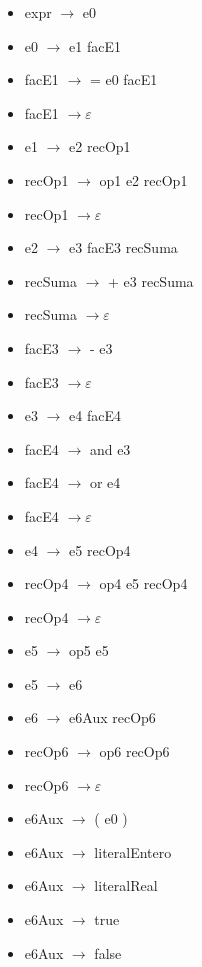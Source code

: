 \documentclass[11pt]{article}
\begin{document}
        \begin{itemize}
            \item expr $\rightarrow$ e0
            \item e0 $\rightarrow$ e1 facE1
            \item facE1 $\rightarrow$ = e0 facE1
            \item facE1 $\rightarrow \varepsilon$
            \item e1 $\rightarrow$ e2 recOp1
            \item recOp1 $\rightarrow$ op1 e2 recOp1
            \item recOp1 $\rightarrow \varepsilon$
            \item e2 $\rightarrow$ e3 facE3  recSuma 
            \item recSuma  $\rightarrow$ + e3 recSuma 
            \item recSuma  $\rightarrow \varepsilon$
            \item facE3  $\rightarrow$ - e3
            \item facE3  $\rightarrow \varepsilon$
            \item e3 $\rightarrow$ e4 facE4
            \item facE4 $\rightarrow$ and e3
            \item facE4 $\rightarrow$ or e4
            \item facE4 $\rightarrow \varepsilon$
            \item e4 $\rightarrow$ e5 recOp4
            \item recOp4 $\rightarrow$ op4 e5 recOp4
            \item recOp4 $\rightarrow \varepsilon$
            \item e5 $\rightarrow$ op5 e5
            \item e5 $\rightarrow$ e6
            \item e6 $\rightarrow$ e6Aux recOp6
            \item recOp6 $\rightarrow$ op6 recOp6
            \item recOp6 $\rightarrow \varepsilon$
            \item e6Aux  $\rightarrow$ ( e0 )
            \item e6Aux  $\rightarrow$ literalEntero
            \item e6Aux  $\rightarrow$ literalReal
            \item e6Aux  $\rightarrow$ true
            \item e6Aux  $\rightarrow$ false

\end{itemize}
\end{document}
